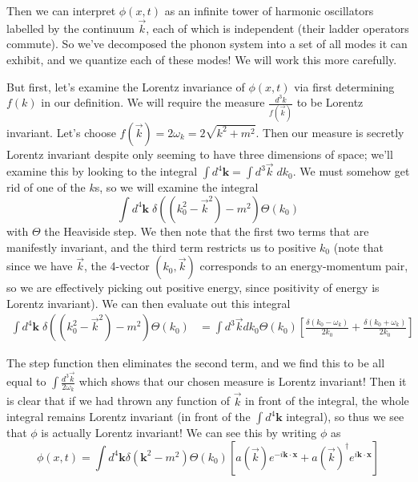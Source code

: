 \documentclass[10pt]{report}
\begin{document}
Then we can interpret $\phi(x,t)$ as an infinite tower of harmonic oscillators labelled by the continuum $\vec{k}$, each of which is independent (their ladder operators commute). So we've decomposed the phonon system into a set of all modes it can exhibit, and we quantize each of these modes! We will work this more carefully.

But first, let's examine the Lorentz invariance of $\phi(x,t)$ via first determining $f(k)$ in our definition. We will require the measure $\frac{d^3k}{f(\vec{k})}$ to be Lorentz invariant. Let's choose $f(\vec{k}) = 2\omega_k = 2\sqrt{k^2 + m^2}$. Then our measure is secretly Lorentz invariant despite only seeming to have three dimensions of space; we'll examine this by looking to the integral $\int d^4\mathbf{k} = \int d^3\vec{k}\; dk_0$. We must somehow get rid of one of the $k$s, so we will examine the integral
\begin{equation}
    \int d^4\mathbf{k}\; \delta\left( (k_0^2 - \vec{k}^2) - m^2 \right)\Theta(k_0)
\end{equation}
with $\Theta$ the Heaviside step. We then note that the first two terms that are manifestly invariant, and the third term restricts us to positive $k_0$ (note that since we have $\vec{k}$, the 4-vector $(k_0, \vec{k})$ corresponds to an energy-momentum pair, so we are effectively picking out positive energy, since positivity of energy is Lorentz invariant). We can then evaluate out this integral
\begin{align}
    \int d^4\mathbf{k}\; \delta\left( (k_0^2 - \vec{k}^2) - m^2 \right)\Theta(k_0) &= \int d^3\vec{k} dk_0 \Theta(k_0)\left[ \frac{\delta(k_0 - \omega_k)}{2k_0} + \frac{\delta(k_0 + \omega_k)}{2k_0} \right]
\end{align}

The step function then eliminates the second term, and we find this to be all equal to $\int \frac{d^3\vec{k}}{2\omega_k}$ which shows that our chosen measure is Lorentz invariant! Then it is clear that if we had thrown any function of $\vec{k}$ in front of the integral, the whole integral remains Lorentz invariant (in front of the $\int d^4\mathbf{k}$ integral), so thus we see that $\phi$ is actually Lorentz invariant! We can see this by writing $\phi$ as
\begin{equation}
    \phi(x,t) = \int d^4\mathbf{k} \delta\left( \mathbf{k}^2 - m^2 \right)\Theta(k_0)\left[ a(\vec{k}) e^{-i \mathbf{k} \cdot \mathbf{x}} + a(\vec{k})^\dagger e^{i \mathbf{k} \cdot \mathbf{x}} \right]
\end{equation}
\end{document}
